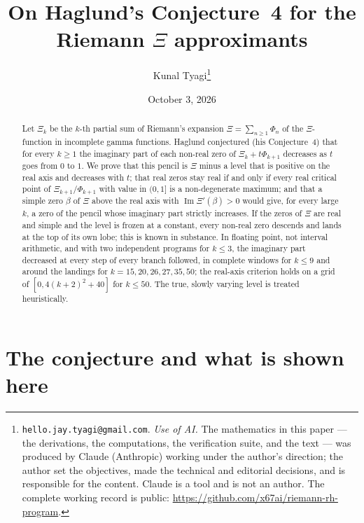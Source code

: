 \documentclass[11pt]{article}
\title{On Haglund's Conjecture~4 for the Riemann $\Xi$ approximants}
\author{Kunal Tyagi\thanks{%
\texttt{hello.jay.tyagi@gmail.com}. \emph{Use of AI.} The mathematics in this
paper --- the derivations, the computations, the verification suite, and the
text --- was produced by Claude (Anthropic) working under the author's
direction; the author set the objectives, made the technical and editorial
decisions, and is responsible for the content. Claude is a tool and is not an
author. The complete working record is public:
\url{https://github.com/x67ai/riemann-rh-program}.}}
\date{October 3, 2026}
\theoremstyle{plain}
\theoremstyle{definition}
\theoremstyle{remark}
\newcommand{\im}{\operatorname{Im}}
\begin{document}
\maketitle

\begin{abstract}
Let $\Xi_k$ be the $k$-th partial sum of Riemann's expansion
$\Xi = \sum_{n \ge 1}\Phi_n$ of the $\Xi$-function in incomplete gamma
functions. Haglund conjectured (his Conjecture~4) that for every $k \ge 1$ the
imaginary part of each non-real zero of $\Xi_k + t\Phi_{k+1}$ decreases as $t$
goes from $0$ to $1$. We prove that this pencil is $\Xi$ minus a level that is
positive on the real axis and decreases with $t$; that real zeros stay real if
and only if every real critical point of $\Xi_{k+1}/\Phi_{k+1}$ with value in
$(0,1]$ is a non-degenerate maximum; and that a simple zero $\beta$ of $\Xi$
above the real axis with $\im\Xi'(\beta) > 0$ would give, for every large
$k$, a zero of the pencil whose imaginary part strictly increases. If the zeros
of $\Xi$ are real and simple and the level is frozen at a constant, every
non-real zero descends and lands at the top of its own lobe; this is known in
substance. In floating point, not interval arithmetic, and with two independent
programs for $k \le 3$, the imaginary part decreased at every step of every
branch followed, in complete windows for $k \le 9$ and around the landings for
$k = 15, 20, 26, 27, 35, 50$; the real-axis criterion holds on a grid of
$[0, 4(k+2)^2 + 40]$ for $k \le 50$. The true, slowly varying level is
treated heuristically.
\end{abstract}

\section{The conjecture and what is shown here}\label{sec:intro}
\end{document}

